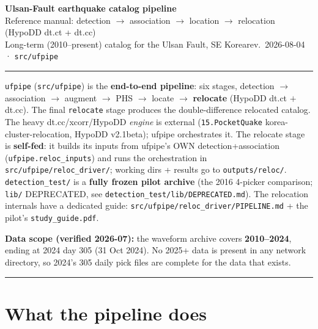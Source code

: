 \documentclass[11pt]{article}
\newcommand{\code}[1]{\texttt{#1}}
\begin{document}
\begin{center}
{\huge\bfseries\sffamily\color{accent} Ulsan-Fault earthquake catalog pipeline}\\[2mm]
{\large\sffamily Reference manual: detection $\rightarrow$ association $\rightarrow$ location $\rightarrow$ relocation (HypoDD dt.ct + dt.cc)}\\[2mm]
{\small\color{soft} Long-term (2010–present) catalog for the Ulsan Fault, SE Korea\hfill rev.\ 2026-08-04 · \code{src/ufpipe}}
\end{center}
\vspace{1mm}\hrule\vspace{3mm}

{\small \code{ufpipe} (\code{src/ufpipe}) is the \textbf{end-to-end pipeline}: six stages, detection $\rightarrow$
association $\rightarrow$ augment $\rightarrow$ PHS $\rightarrow$ locate $\rightarrow$ \textbf{relocate} (HypoDD
dt.ct $+$ dt.cc). The final \code{relocate} stage produces the double-difference relocated catalog. The heavy
dt.cc/xcorr/HypoDD \emph{engine} is external (\code{15.PocketQuake} korea-cluster-relocation, HypoDD v2.1beta);
ufpipe orchestrates it. The relocate stage is \textbf{self-fed}: it builds its inputs from ufpipe's OWN
detection+association (\code{ufpipe.reloc\_inputs}) and runs the orchestration in
\code{src/ufpipe/reloc\_driver/}; working dirs + results go to \code{outputs/reloc/}.
\code{detection\_test/} is a \textbf{fully frozen pilot archive} (the 2016 4-picker comparison;
\code{lib/} DEPRECATED, see \code{detection\_test/lib/DEPRECATED.md}). The relocation internals have a
dedicated guide: \code{src/ufpipe/reloc\_driver/PIPELINE.md} + the pilot's \code{study\_guide.pdf}.}

\begin{center}\small\color{soft}
\textbf{Data scope (verified 2026-07):} the waveform archive covers \textbf{2010--2024}, ending at
2024 day 305 (31 Oct 2024). No 2025+ data is present in any network directory, so 2024's 305 daily pick
files are complete for the data that exists.
\end{center}

\tableofcontents
\vspace{3mm}\hrule

\section{What the pipeline does}
\end{document}
